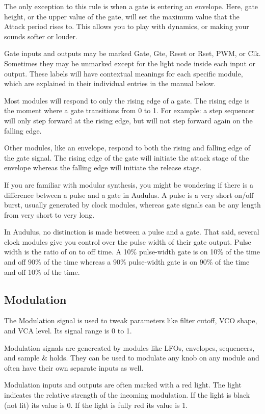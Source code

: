 \documentclass[11pt]{book}
\begin{document}
The only exception to this rule is when a gate is entering an envelope. Here, gate height, or the upper value of the gate, will set the maximum value that the Attack period rises to. This allows you to play with dynamics, or making your sounds softer or louder.

Gate inputs and outputs may be marked Gate, Gte, Reset or Rset, PWM, or Clk. Sometimes they may be unmarked except for the light node inside each input or output. These labels will have contextual meanings for each specific module, which are explained in their individual entries in the manual below.

Most modules will respond to only the rising edge of a gate. The rising edge is the moment where a gate transitions from 0 to 1. For example: a step sequencer will only step forward at the rising edge, but will not step forward again on the falling edge.

Other modules, like an envelope, respond to both the rising and falling edge of the gate signal. The rising edge of the gate will initiate the attack stage of the envelope whereas the falling edge will initiate the release stage.

If you are familiar with modular synthesis, you might be wondering if there is a difference between a pulse and a gate in Audulus. A pulse is a very short on/off burst, usually generated by clock modules, whereas gate signals can be any length from very short to very long.

In Audulus, no distinction is made between a pulse and a gate. That said, several clock modules give you control over the pulse width of their gate output. Pulse width is the ratio of on to off time. A 10\% pulse-width gate is on 10\% of the time and off 90\% of the time whereas a 90\% pulse-width gate is on 90\% of the time and off 10\% of the time.

\subsection{Modulation}

The Modulation signal is used to tweak parameters like filter cutoff, VCO shape, and VCA level. Its signal range is 0 to 1. 

Modulation signals are genereated by modules like LFOs, envelopes, sequencers, and sample \& holds. They can be used to modulate any knob on any module and often have their own separate inputs as well.

Modulation inputs and outputs are often marked with a red light. The light indicates the relative strength of the incoming modulation. If the light is black (not lit) its value is 0. If the light is fully red its value is 1.
\end{document}
